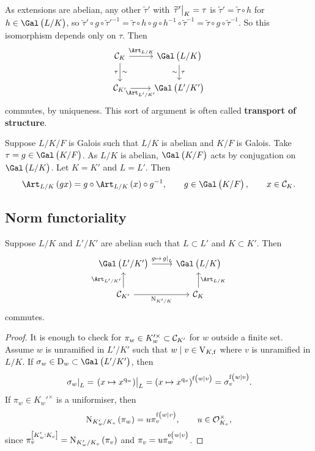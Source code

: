 \pagebreak

As extensions are abelian, any other $ \widetilde{\tau}' $ with $ \left. \widetilde{\tau}' \right|_K = \tau $ is $ \widetilde{\tau}' = \widetilde{\tau} \circ h $ for $ h \in \Gal\br{L / K} $, so $ \widetilde{\tau}' \circ g \circ \widetilde{\tau}'^{-1} = \widetilde{\tau} \circ h \circ g \circ h^{-1} \circ \widetilde{\tau}^{-1} = \widetilde{\tau} \circ g \circ \widetilde{\tau}^{-1} $. So this isomorphism depends only on $ \tau $. Then
$$
\begin{tikzcd}
\CCC_K \arrow{r}{\Art_{L / K}} \arrow{d}{\sim}[swap]{\tau} & \Gal\br{L / K} \arrow{d}{\tau}[swap]{\sim} \\
\CCC_{K'} \arrow{r}[swap]{\Art_{L' / K'}} & \Gal\br{L' / K'}
\end{tikzcd}
$$
commutes, by uniqueness. This sort of argument is often called \textbf{transport of structure}.

\begin{example*}
Suppose $ L / K / F $ is Galois such that $ L / K $ is abelian and $ K / F $ is Galois. Take $ \tau = g \in \Gal\br{K / F} $. As $ L / K $ is abelian, $ \Gal\br{K / F} $ acts by conjugation on $ \Gal\br{L / K} $. Let $ K = K' $ and $ L = L' $. Then
\begin{equation}
\label{eq:5}
\Art_{L / K}\br{gx} = g \circ \Art_{L / K}\br{x} \circ g^{-1}, \qquad g \in \Gal\br{K / F}, \qquad x \in \CCC_K.
\end{equation}
\end{example*}

\subsection{Norm functoriality}

\begin{proposition}
Suppose $ L / K $ and $ L' / K' $ are abelian such that $ L \subset L' $ and $ K \subset K' $. Then
$$
\begin{tikzcd}
\Gal\br{L' / K'} \arrow{r}{g \mapsto \eval{g}_L} & \Gal\br{L / K} \\
\CCC_{K'} \arrow{u}{\Art_{L' / K'}} \arrow{r}[swap]{\N_{K' / K}} & \CCC_K \arrow{u}[swap]{\Art_{L / K}}
\end{tikzcd}
$$
commutes.
\end{proposition}

\begin{proof}
It is enough to check for $ \pi_w \in K_w'^\times \subset \mathcal{C}_{K'} $ for $ w $ outside a finite set. Assume $ w $ is unramified in $ L' / K' $ such that $ w \mid v \in \mathrm{V}_{K, \mathrm{f}} $ where $ v $ is unramified in $ L / K $. If $ \sigma_w \in \D_w \subset \Gal\br{L' / K'} $, then
$$ \eval{\sigma_w}_L = \eval{\br{x \mapsto x^{\q_w}}}_L = \br{x \mapsto x^{\q_v}}^{\f\br{w \mid v}} = \sigma_v^{\f\br{w \mid v}}. $$
If $ \pi_w \in K_w'^\times $ is a uniformiser, then
$$ \N_{K_w' / K_v}\br{\pi_w} = u\pi_v^{\f\br{w \mid v}}, \qquad u \in \OOO_{K_v}^\times, $$
since $ \pi_v^{\sbr{K_w' : K_v}} = \N_{K_w' / K_v}\br{\pi_v} $ and $ \pi_v = u\pi_w^{\e\br{w \mid v}} $.
\end{proof}

